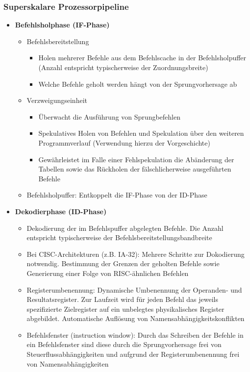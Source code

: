 \subsubsection{Superskalare Prozessorpipeline}
\begin{itemize}
	\item \textbf{Befehlsholphase (IF-Phase)}
	\begin{itemize}
		\item Befehlsbereitstellung
		\begin{itemize}
			\item Holen mehrerer Befehle aus dem Befehlscache in der Befehlsholpuffer (Anzahl entspricht typischerweise der Zuordnungsbreite)
			\item Welche Befehle geholt werden hängt von der Sprungvorhersage ab
		\end{itemize}
		\item Verzweigungseinheit
		\begin{itemize}
			\item Überwacht die Ausführung von Sprungbefehlen
			\item Spekulatives Holen von Befehlen und Spekulation über den weiteren Programmverlauf (Verwendung hierzu der Vorgeschichte)
			\item Gewährleistet im Falle einer Fehlspekulation die Abänderung der Tabellen sowie das Rückholen der fälschlicherweise ausgeführten Befehle
		\end{itemize}
		\item Befehlsholpuffer: Entkoppelt die IF-Phase von der ID-Phase
	\end{itemize}
	\item \textbf{Dekodierphase (ID-Phase)}
	\begin{itemize}
		\item Dekodierung der im Befehlspuffer abgelegten Befehle. Die Anzahl entspricht typischerweise der Befehlsbereitstellungsbandbreite
		\item Bei CISC-Architekturen (z.B. IA-32): Mehrere Schritte zur Dokodierung notwendig. Bestimmung der Grenzen der geholten Befehle sowie Generierung einer Folge von RISC-ähnlichen Befehlen %
		\item Registerumbenennung: Dynamische Umbenennung der Operanden- und Resultatsregister. Zur Laufzeit wird für jeden Befehl das jeweils spezifizierte Zielregister auf ein unbelegtes physikalisches Register abgebildet. Automatische Auflösung von Namensabhängigkeitskonflikten
		\item Befehlsfenster (instruction window): Durch das Schreiben der Befehle in ein Befehlsfenster sind diese durch die Sprungvorhersage frei von Steuerflussabhängigkeiten und aufgrund der Registerumbenennung frei von Namensabhängigkeiten

\end{itemize}
\end{itemize}
